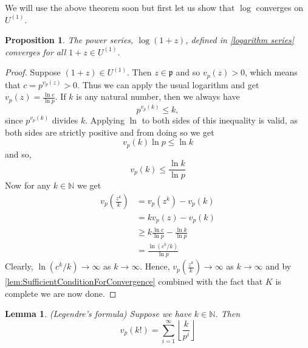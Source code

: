 \documentclass{article}
\newtheorem{proposition}{Proposition}[section]
\newtheorem{lemma}{Lemma}[section]
\newcommand{\mfrak}[1]{\mathfrak{#1}}
\newcommand{\mbb}[1]{\mathbb{#1}}
\numberwithin{equation}{section}
\begin{document}
We will use the above theorem soon but first let us show that $\log$ converges on $U^{(1)}$.
\begin{proposition}
    The power series, $\log(1+z)$, defined in \cref{logarithm series} converges for all $1+z \in U^{(1)}$.
\end{proposition}
\begin{proof}
    Suppose $(1 + z) \in U^{(1)}$. Then $z \in \mfrak p$ and so $v_p(z) > 0$, which means that $c = p^{v_p(z)} > 0$. Thus we can apply the usual logarithm and get $v_p(z) = \frac{\ln c}{\ln p}$. If $k$ is any natural number, then we always have $$p^{v_p(k)} \leq k,$$ since $p^{v_p(k)}$ divides $k$. Applying $\ln$ to both sides of this inequality is valid, as both sides are strictly positive and from doing so we get
    $$v_p(k) \ln p \leq \ln k$$
    and so,
    $$v_p(k) \leq \frac{\ln k}{\ln p}$$
    Now for any $k \in \mbb N$ we get
    \begin{align*}
        v_p(\frac{z^k}{k}) & = v_p(z^k) - v_p(k)                              \\
                           & = kv_p(z) - v_p(k)                               \\
                           & \geq k \frac{\ln c}{\ln p} - \frac{\ln k}{\ln p} \\
                           & = \frac{\ln (c^k / k)}{\ln p}
    \end{align*}
    Clearly, $\ln (c^k / k) \to \infty$ as $k \to \infty$. Hence, $v_p(\frac{z^k}{k}) \to \infty$ as $k \to \infty$ and by \cref{lem:SufficientConditionForConvergence} combined with the fact that $K$ is complete we are now done.
\end{proof}

\begin{lemma}(Legendre's formula)
    Suppose we have $k \in \mbb N$. Then
    $$v_p(k!) = \sum_{i = 1}^{\infty} \left\lfloor \frac{k}{p^i} \right \rfloor$$
\end{lemma}
\end{document}
